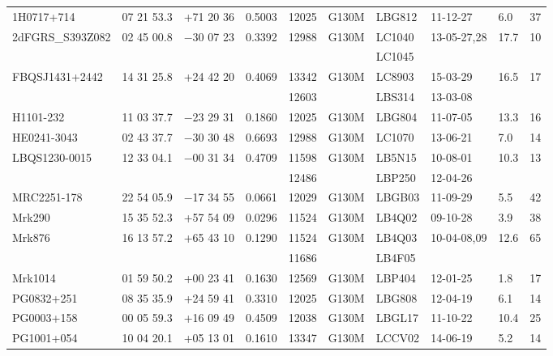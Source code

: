 \begin{landscape}
\begin{center}
\begin{longtable}{l l l l l l l l l l}
1H0717+714		  		&  07 21 53.3  &  +71 20  36	&    0.5003	& 12025	&   G130M	&   LBG812	& 11-12-27      	 	  &  6.0    &      37         \\
2dFGRS\_S393Z082  		&  02 45 00.8  &  $-$30 07  23	&    0.3392	& 12988	&   G130M	&   LC1040	& 13-05-27,28 	 	  & 17.7   &      10         \\
				  		&		       &			&			&		&			&    LC1045	&				  &	       &		   \\
FBQSJ1431+2442     		&  14 31 25.8  &  +24 42 20	&   0.4069		& 13342	&   G130M	&   LC8903	& 15-03-29		  & 16.5  &      17          \\
				 		&		       &			&			& 12603	&			&   LBS314	& 13-03-08		  &	      &		  	  \\
H1101-232   		 		&  11 03 37.7  &  $-$23 29 31	&   0.1860		& 12025	&   G130M	&   LBG804	& 11-07-05  		   & 13.3  &      16         \\
HE0241-3043  		 		&  02 43 37.7  &  $-$30 30 48	&   0.6693		& 12988	&   G130M	&   LC1070	& 13-06-21  		   & 7.0    &      14         \\
LBQS1230-0015  	 		&  12 33 04.1  &  $-$00 31 34    	&   0.4709		& 11598	&   G130M	&   LB5N15	& 10-08-01  		   & 10.3  &      13         \\
				 		&		       &			&			& 12486	&			&   LBP250	& 12-04-26		   &	       &	  	   \\
MRC2251-178  	 		&  22 54 05.9  &  $-$17 34 55	&   0.0661		& 12029	&   G130M	&   LBGB03	& 11-09-29                   &  5.5   &      42         \\
Mrk290  					&  15 35 52.3  &  +57 54 09	&   0.0296		& 11524	&   G130M	&   LB4Q02	& 09-10-28  		   &   3.9  &      38         \\
Mrk876  					&  16 13 57.2  &  +65 43 10	&   0.1290		& 11524	&   G130M	&   LB4Q03	& 10-04-08,09  		   & 12.6  &      65         \\
				 		&		       &			&			& 11686	&			&   LB4F05	&				   &	       &	  	   \\
Mrk1014  					&  01 59 50.2  &  +00 23 41	&   0.1630		& 12569	&   G130M	&   LBP404	& 12-01-25  		   &  1.8   &      17         \\
PG0832+251  				&  08 35 35.9  &  +24 59 41	&   0.3310		& 12025	&   G130M	&   LBG808	& 12-04-19		   &  6.1   &      14         \\
PG0003+158  				&  00 05 59.3  &  +16 09 49	&   0.4509		& 12038	&   G130M	&   LBGL17	& 11-10-22  		   & 10.4  &      25         \\
PG1001+054  				&  10 04 20.1  &  +05 13 01	&   0.1610		& 13347	&   G130M	&   LCCV02	& 14-06-19  		   &  5.2   &      14         \\

\end{longtable}
\end{center}
\end{landscape}
